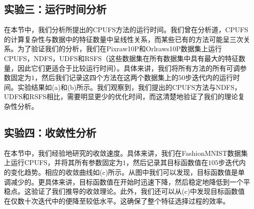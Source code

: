 \subsection{实验三：运行时间分析}
在本节中，我们分析所提出的CPUFS方法的运行时间。我们曾在分析道，CPUFS的计算复杂性与数据中的特征数量中呈线性关系，而某些已有的方法可能呈三次关系。为了验证我们的分析，我们在Pixraw10P和Orlraws10P数据集上运行CPUFS，NDFS，UDFS和RSFS（这些数据集在所有数据集中具有最大的特征数量，因此它们更适合于比较运行时间）。具体来讲，我们将所有方法的所有可调参数固定为$1$，然后我们记录这四个方法在这两个数据集上的$50$步迭代内的运行时间。实验结果如(a)和(b)所示。我们观察到，我们提出的CPUFS方法与NDFS，UDFS和RSFS相比，需要明显更少的优化时间，而这清楚地验证了我们的理论复杂性分析。

\subsection{实验四：收敛性分析}
在本节中，我们经验地研究的收敛速度。具体来讲，我们在FashionMNIST数据集上运行CPUFS，并将其所有参数固定为$1$，然后记录其目标函数值在$105$步迭代内的变化趋势。相应的收敛曲线如(c)所示。从图中我们可以发现，目标函数值是单调减少的。更具体来讲，目标函数值在开始时迅速下降，然后稳定地降低到一个平稳点。这验证了我们推导的收敛理论。此外，我们还可以从(c)中发现目标函数值在仅数十次迭代中的便降至较低水平。这确保了整个特征选择过程的效率。

